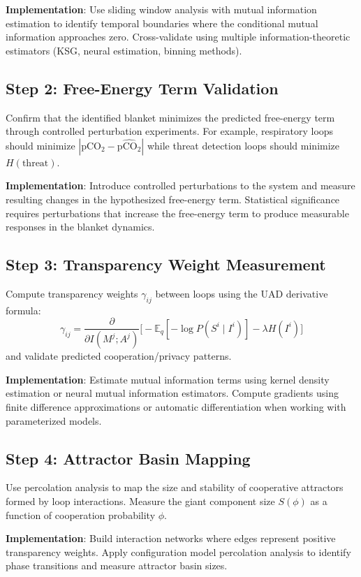 \documentclass[10pt,conference]{IEEEtran}
\begin{document}
\textbf{Implementation}: Use sliding window analysis with mutual information estimation to identify temporal boundaries where the conditional mutual information approaches zero. Cross-validate using multiple information-theoretic estimators (KSG, neural estimation, binning methods).

\subsection{Step 2: Free-Energy Term Validation}
Confirm that the identified blanket minimizes the predicted free-energy term through controlled perturbation experiments. For example, respiratory loops should minimize $|\mathrm{pCO_2}-\widehat{\mathrm{pCO_2}}|$ while threat detection loops should minimize $H(\mathrm{threat})$.

\textbf{Implementation}: Introduce controlled perturbations to the system and measure resulting changes in the hypothesized free-energy term. Statistical significance requires perturbations that increase the free-energy term to produce measurable responses in the blanket dynamics.

\subsection{Step 3: Transparency Weight Measurement}
Compute transparency weights $\gamma_{ij}$ between loops using the UAD derivative formula:
\[
\gamma_{ij} = \frac{\partial}{\partial I(M^j;A^j)} \bigl[-\mathbb E_q[-\log P(S^i\mid I^i)]-\lambda H(I^i)\bigr]
\]
and validate predicted cooperation/privacy patterns.

\textbf{Implementation}: Estimate mutual information terms using kernel density estimation or neural mutual information estimators. Compute gradients using finite difference approximations or automatic differentiation when working with parameterized models.

\subsection{Step 4: Attractor Basin Mapping}
Use percolation analysis to map the size and stability of cooperative attractors formed by loop interactions. Measure the giant component size $S(\phi)$ as a function of cooperation probability $\phi$.

\textbf{Implementation}: Build interaction networks where edges represent positive transparency weights. Apply configuration model percolation analysis to identify phase transitions and measure attractor basin sizes.
\end{document}
